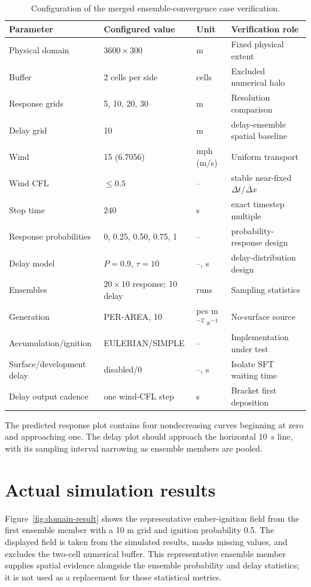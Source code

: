 \begin{table}[htbp]
\centering\small
\begin{tabular}{p{}p{}p{}p{}}
\toprule
Parameter & Configured value & Unit & Verification role \\
\midrule
Physical domain & $3600\times300$ & m & Fixed physical extent \\
Buffer & 2 cells per side & cells & Excluded numerical halo \\
Response grids & 5, 10, 20, 30 & m & Resolution comparison \\
Delay grid & 10 & m & delay-ensemble spatial baseline \\
Wind & 15 (6.7056) & mph (m/s) & Uniform transport \\
Wind CFL & $\leq0.5$ & -- & stable near-fixed $\Delta t/\Delta x$ \\
Stop time & 240 & s & exact timestep multiple \\
Response probabilities & 0, 0.25, 0.50, 0.75, 1 & -- & probability-response design \\
Delay model & $P=0.9$, $\tau=10$ & --, s & delay-distribution design \\
Ensembles & $20\times10$ response; 10 delay & runs & Sampling statistics \\
Generation & PER-AREA, 10 & pcs m$^{-2}$ s$^{-1}$ & No-surface source \\
Accumulation/ignition & EULERIAN/SIMPLE & -- & Implementation under test \\
Surface/development delay & disabled/0 & --, s & Isolate SFT waiting time \\
Delay output cadence & one wind-CFL step & s & Bracket first deposition \\
\bottomrule
\end{tabular}
\caption{Configuration of the merged ensemble-convergence case verification.}
\end{table}

The predicted response plot contains four nondecreasing curves beginning at zero
and approaching one. The delay plot should approach the horizontal 10~s line,
with its sampling interval narrowing as ensemble members are pooled.

\section{Actual simulation results}

Figure~\ref{fig:domain-result} shows the representative ember-ignition field from the first ensemble member with a 10 m grid and ignition probability 0.5.
The displayed field is taken from the simulated results, masks missing values, and excludes
the two-cell numerical buffer.  This representative ensemble member supplies spatial evidence alongside the ensemble probability and delay statistics; it is not used as a replacement for those statistical metrics.

